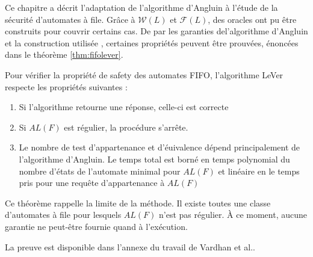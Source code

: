 Ce chapitre a décrit l'adaptation de l'algorithme d'Angluin à l'étude de la sécurité d'automates à file. Grâce à $\mathcal{W}(L)$ et $\mathcal{F}(L)$, des oracles ont pu être construits pour couvrir certains cas. De par les garanties del'algorithme d'Angluin\cite{Angluin87} et la construction utilisée \cite{Vardhan04}, certaines propriétés peuvent être prouvées, énoncées dans le théorème \ref{thm:fifolever}.

\begin{theorem}\label{thm:fifolever}
  Pour vérifier la propriété de safety des automates FIFO, l'algorithme LeVer respecte les propriétés suivantes :
  \begin{enumerate}
    \item Si l'algorithme retourne une réponse, celle-ci est correcte
    \item Si $AL(F)$ est régulier, la procédure s'arrête.
    \item Le nombre de test d'appartenance et d'éuivalence dépend principalement de l'algorithme d'Angluin. Le temps total est borné en temps polynomial du nombre d'états de l'automate minimal pour $AL(F)$ et linéaire en le temps pris pour une requête d'appartenance à $AL(F)$
  \end{enumerate}
\end{theorem}

Ce théorème rappelle la limite de la méthode. Il existe toutes une classe d'automates à file pour lesquels $AL(F)$ n'est pas régulier. À ce moment, aucune garantie ne peut-être fournie quand à l'exécution.


La preuve est disponible dans l'annexe du travail de Vardhan et al.\cite{Vardhan04}.
